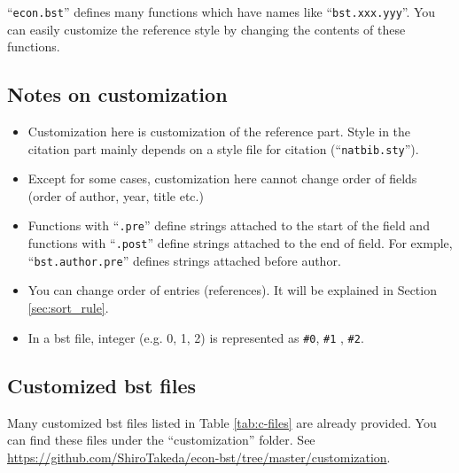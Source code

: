 \documentclass[10pt]{article}
\begin{document}
``\texttt{econ.bst}'' defines many functions which have names like
``\texttt{bst.xxx.yyy}''.  You can easily customize the reference style by
changing the contents of these functions.

\subsection{Notes on customization}

\begin{itemize}
 \item Customization here is customization of the reference part.  Style
       in the citation part mainly depends on a style file for citation
       (``\texttt{natbib.sty}'').
 \item Except for some cases, customization here cannot change order
       of fields (order of author, year, title etc.)
 \item Functions with ``\texttt{.pre}'' define strings attached to the start
       of the field and functions with ``\texttt{.post}'' define strings
       attached to the end of field.  For exmple,
       ``\texttt{bst.author.pre}'' defines strings attached before author.
 \item You can change order of entries (references).  It will be
       explained in Section \ref{sec:sort_rule}.
 \item In a bst file, integer (e.g. 0, 1, 2) is represented as \verb|#0|, \verb|#1| , \verb|#2|.
\end{itemize}

\subsection{Customized bst files}

Many customized bst files listed in Table \ref{tab:c-files} are already
provided. You can find these files under the ``customization'' folder.  See
\url{https://github.com/ShiroTakeda/econ-bst/tree/master/customization}.
\end{document}
